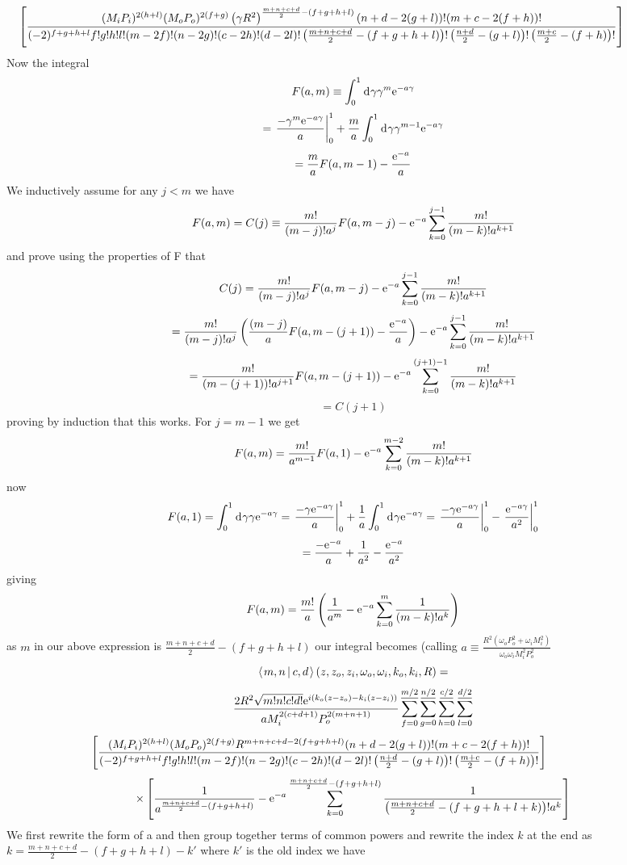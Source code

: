 \documentclass[11pt]{amsart}
\makeatletter
\newcommand{\e}{{\rm e}}				%
\newcommand{\msp}[1]{\mspace{#1mu}}		%
\newcommand{\0}{\varnothing}		%
\newcommand{\eq}{\equiv}		%
\newcommand{\dd}{\msp{1} {\rm{d}} \msp{1}}	%
\newcommand{\brac}[2]{\left\langle\msp{2} #1\left\lvert \msp{3.5} #2 \right.\right\rangle}	%
\newcommand{\1}{!}
\newcommand{\2}{@}
\newcommand{\3}{\#}
\newcommand{\4}{\$}
\newcommand{\5}{\%}
\newcommand{\6}{$^\wedge$}
\newcommand{\7}{\&}
\newcommand{\8}{*}
\newcommand{\9}{(}
\makeatother
\begin{document}
\[
\msp{-100}\left[\frac{(M_iP_i)^{2(h+l)}(M_oP_o)^{2(f+g)}\left(\gamma R^2\right)^{\frac{m+n+c+d}{2}-(f+g+h+l)}(n+d-2(g+l))!(m+c-2(f+h))!}{(-2)^{f+g+h+l}f!g!h!l!(m-2f)!(n-2g)!(c-2h)!(d-2l)!\left(\frac{m+n+c+d}{2}-(f+g+h+l)\right)!\left(\frac{n+d}{2}-(g+l)\right)!\left(\frac{m+c}{2}-(f+h)\right)!}\right]
\]
Now the integral
\[
F(a,m) \eq \int_0^1\dd \gamma \gamma^m\e^{-a\gamma}
\]
\[
=\left.\frac{-\gamma^m\e^{-a\gamma}}{a}\right|_0^1 +\frac{m}{a}\int_0^1\dd \gamma \gamma^{m-1}\e^{-a\gamma}
\]
\[
=\frac{m}{a}F(a,m-1) - \frac{\e^{-a}}{a}
\]
We inductively assume for any $j<m$ we have
\[
F(a,m) = C(j)\eq \frac{m!}{(m-j)!a^j}F(a,m-j)-\e^{-a}\sum_{k=0}^{j-1}\frac{m!}{(m-k)!a^{k+1}}
\]
and prove using the properties of F that
\[
C(j) = \frac{m!}{(m-j)!a^j}F(a,m-j)-\e^{-a}\sum_{k=0}^{j-1}\frac{m!}{(m-k)!a^{k+1}} 
\]
\[= \frac{m!}{(m-j)!a^j}\left(\frac{(m-j)}{a}F(a,m-(j+1))-\frac{\e^{-a}}{a}\right)-\e^{-a}\sum_{k=0}^{j-1}\frac{m!}{(m-k)!a^{k+1}} 
\]
\[
=\frac{m!}{(m-(j+1))!a^{j+1}}F(a,m-(j+1))-\e^{-a}\sum_{k=0}^{(j+1)-1}\frac{m!}{(m-k)!a^{k+1}}
\]
\[
=C(j+1)
\]
proving by induction that this works. For $j=m-1$ we get
\[
F(a,m) = \frac{m!}{a^{m-1}}F(a,1)-\e^{-a}\sum_{k=0}^{m-2}\frac{m!}{(m-k)!a^{k+1}}
\]
now 
\[
F(a,1) = \int_0^1 \dd \gamma \gamma \e^{-a\gamma} = \left.\frac{-\gamma\e^{-a\gamma}}{a}\right|_0^1+\frac{1}{a}\int_0^1\dd \gamma \e^{-a\gamma} =  \left.\frac{-\gamma\e^{-a\gamma}}{a}\right|_0^1-\left.\frac{\e^{-a\gamma}}{a^2}\right|_0^1
\]
\[
=\frac{-\e^{-a}}{a} +\frac{1}{a^2}-\frac{\e^{-a}}{a^2}
\]
giving
\[
F(a,m) = \frac{m!}{a}\left(\frac{1}{a^{m}}-\e^{-a}\sum_{k=0}^{m}\frac{1}{(m-k)!a^{k}}\right)
\]
as $m$ in our above expression is $\frac{m+n+c+d}{2}-(f+g+h+l)$ our integral becomes (calling $a\eq \frac{R^2(\omega_oP_o^2+\omega_iM_i^2)}{\omega_o\omega_iM_i^2P_o^2}$
\[
\brac{m,n}{c,d}(z,z_o,z_i,\omega_o,\omega_i,k_o,k_i,R) = 
\]
\[
\frac{2R^2\sqrt{ m!n!c!d!}\e^{i\left(k_o(z-z_o)-k_i(z-z_i)\right)}}{aM_i^{2(c+d+1)}P_o^{2(m+n+1)}}\sum_{f=0}^{\underline{m/2}}\sum_{g=0}^{\underline{n/2}}\sum_{h=0}^{\underline{c/2}}\sum_{l=0}^{\underline{d/2}}
\]
\[
\msp{-110}\left[\frac{(M_iP_i)^{2(h+l)}(M_oP_o)^{2(f+g)}R^{m+n+c+d-2(f+g+h+l)}(n+d-2(g+l))!(m+c-2(f+h))!}{(-2)^{f+g+h+l}f!g!h!l!(m-2f)!(n-2g)!(c-2h)!(d-2l)!\left(\frac{n+d}{2}-(g+l)\right)!\left(\frac{m+c}{2}-(f+h)\right)!}\right]
\]
\[
\times \left[\frac{1}{a^{\frac{m+n+c+d}{2}-(f+g+h+l)}}-\e^{-a}\sum_{k=0}^{\frac{m+n+c+d}{2}-(f+g+h+l)}\frac{1}{\left(\frac{m+n+c+d}{2}-(f+g+h+l+k)\right)!a^k}\right]
\]
We first rewrite the form of a and then group together terms of common powers and rewrite the index $k$ at the end as $k = \frac{m+n+c+d}{2}-(f+g+h+l)-k'$ where $k'$ is the old index we have
\end{document}
